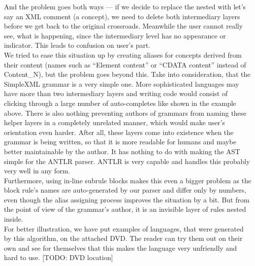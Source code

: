And the problem goes both ways --- if we decide to replace the nested  with let's say an XML comment (a  concept), we need to delete both intermediary layers before we get back to the original  crossroads.
Meanwhile the user cannot really see, what is happening, since the intermediary level has no appearance or indicator.
This leads to confusion on user's part.
\\

We tried to ease this situation up by creating aliases for concepts derived from their content (names such as “Element content” or “CDATA content” instead of Content{\_}N), but the problem goes beyond this.
Take into consideration, that the SimpleXML grammar is a very simple one.
More sophisticated languages may have more than two intermediary layers and writing code would consist of clicking through a large number of auto-completes like shown in the example above.
There is also nothing preventing authors of grammars from naming these helper layers in a completely unrelated manner, which would make user's orientation even harder.
After all, these layers come into existence when the grammar is being written, so that it is more readable for humans and maybe better maintainable by the author.
It has nothing to do with making the AST simple for the ANTLR parser.
ANTLR is very capable and handles this probably very well in any form.
\\

Furthermore, using in-line subrule blocks makes this even a bigger problem as the block rule's names are auto-generated by our parser and differ only by numbers, even though the alias assigning process improves the situation by a bit.
But from the point of view of the grammar's author, it is an invisible layer of rules nested inside.
\\

For better illustration, we have put examples of languages, that were generated by this algorithm, on the attached DVD. The reader can try them out on their own and see for themselves that this makes the language very unfriendly and hard to use. [TODO: DVD location]

